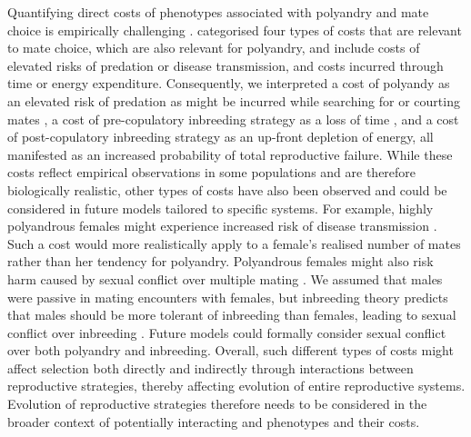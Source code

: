 \documentclass[10pt,letterpaper]{article}
\begin{document}
Quantifying direct costs of phenotypes associated with polyandry and mate choice is empirically challenging \cite[][]{Pomiankowski1987, Kokko2003}. \cite{Pomiankowski1987} categorised four types of costs that are relevant to mate choice, which are also relevant for polyandry, and include costs of elevated risks of predation or disease transmission, and costs incurred through time or energy expenditure. Consequently, we interpreted a cost of polyandy as an elevated risk of predation as might be incurred while searching for or courting mates \cite[e.g.,][]{Rowe1988, Rowe1994}, a cost of pre-copulatory inbreeding strategy as a loss of time \cite[i.e., risk of not finding a mate in time due to choosiness; e.g.,][]{Kokko2013}, and a cost of post-copulatory inbreeding strategy as an up-front depletion of energy, all manifested as an increased probability of total reproductive failure. While these costs reflect empirical observations in some populations and are therefore biologically realistic, other types of costs have also been observed and could be considered in future models tailored to specific systems. For example, highly polyandrous females might experience increased risk of disease transmission \cite[][]{Roberts2015a}. Such a cost would more realistically apply to a female's realised number of mates rather than her tendency for polyandry. Polyandrous females might also risk harm caused by sexual conflict over multiple mating \cite[e.g.,][]{Arnqvist2005a, Parker2006}. We assumed that males were passive in mating encounters with females, but inbreeding theory predicts that males should be more tolerant of inbreeding than females, leading to sexual conflict over inbreeding \cite[][]{Parker1979, Parker2006, Kokko2006, Duthie2015a}. Future models could formally consider sexual conflict over both polyandry and inbreeding. Overall, such different types of costs might affect selection both directly and indirectly through interactions between reproductive strategies, thereby affecting evolution of entire reproductive systems. Evolution of reproductive strategies therefore needs to be considered in the broader context of potentially interacting and phenotypes and their costs.
\end{document}
